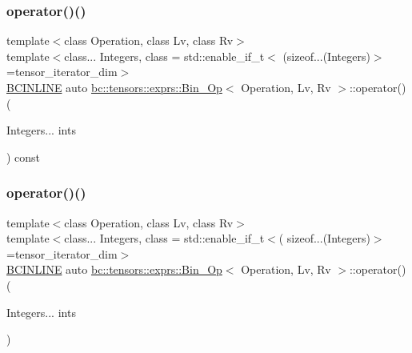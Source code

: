 \mbox{\label{structbc_1_1tensors_1_1exprs_1_1Bin__Op_a56599cd99d7f1dac59cada714a03018f}} 
\subsubsection{\texorpdfstring{operator()()}{operator()()}\hspace{0.1cm}{\footnotesize\ttfamily [1/2]}}
{\footnotesize\ttfamily template$<$class Operation, class Lv, class Rv$>$ \\
template$<$class... Integers, class  = std\+::enable\+\_\+if\+\_\+t$<$				(sizeof...(\+Integers)$>$=tensor\+\_\+iterator\+\_\+dim$>$ \\
\hyperlink{common_8h_a6699e8b0449da5c0fafb878e59c1d4b1}{B\+C\+I\+N\+L\+I\+NE} auto \hyperlink{structbc_1_1tensors_1_1exprs_1_1Bin__Op}{bc\+::tensors\+::exprs\+::\+Bin\+\_\+\+Op}$<$ Operation, Lv, Rv $>$\+::operator() (\begin{DoxyParamCaption}\item[{Integers...}]{ints }\end{DoxyParamCaption}) const\hspace{0.3cm}{\ttfamily [inline]}}

\mbox{\label{structbc_1_1tensors_1_1exprs_1_1Bin__Op_a8465e6a42066c4ab94d564fedf33b475}} 
\subsubsection{\texorpdfstring{operator()()}{operator()()}\hspace{0.1cm}{\footnotesize\ttfamily [2/2]}}
{\footnotesize\ttfamily template$<$class Operation, class Lv, class Rv$>$ \\
template$<$class... Integers, class  = std\+::enable\+\_\+if\+\_\+t$<$(				sizeof...(\+Integers)$>$=tensor\+\_\+iterator\+\_\+dim$>$ \\
\hyperlink{common_8h_a6699e8b0449da5c0fafb878e59c1d4b1}{B\+C\+I\+N\+L\+I\+NE} auto \hyperlink{structbc_1_1tensors_1_1exprs_1_1Bin__Op}{bc\+::tensors\+::exprs\+::\+Bin\+\_\+\+Op}$<$ Operation, Lv, Rv $>$\+::operator() (\begin{DoxyParamCaption}\item[{Integers...}]{ints }\end{DoxyParamCaption})\hspace{0.3cm}{\ttfamily [inline]}}

